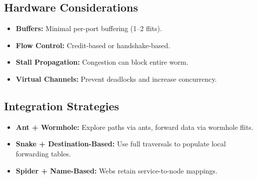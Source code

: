 \documentclass[../../../OAE-SPEC-MAIN.tex]{subfiles}
\begin{document}
\subsection{Hardware Considerations}

\begin{itemize}
\item \textbf{Buffers:} Minimal per-port buffering (1--2 flits).
\item \textbf{Flow Control:} Credit-based or handshake-based.
\item \textbf{Stall Propagation:} Congestion can block entire worm.
\item \textbf{Virtual Channels:} Prevent deadlocks and increase concurrency.
\end{itemize}

\subsection{Integration Strategies}

\begin{itemize}
\item \textbf{Ant + Wormhole:} Explore paths via ants, forward data via wormhole flits.
\item \textbf{Snake + Destination-Based:} Use full traversals to populate local forwarding tables.
\item \textbf{Spider + Name-Based:} Webs retain service-to-node mappings.
\end{itemize}
\end{document}
